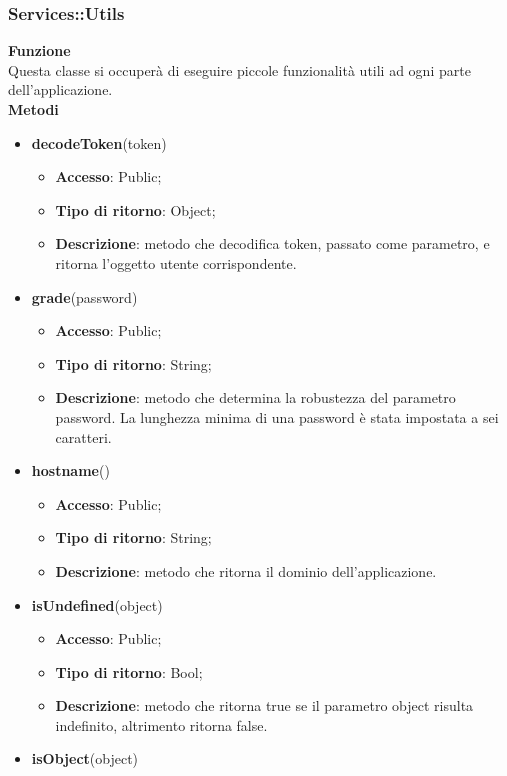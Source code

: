 \subsubsection{Services::Utils}{
		\label{sub:servicesUtils}
		\textbf{Funzione}\\
		\indent Questa classe si occuperà di eseguire piccole funzionalità utili ad ogni parte dell'applicazione.\\
		\textbf{Metodi}
		\begin{itemize}
			\item \textbf{decodeToken}(token)
			\begin{itemize}
				\item \textbf{Accesso}: Public;
				\item \textbf{Tipo di ritorno}: Object;
				\item \textbf{Descrizione}: metodo che decodifica token, passato come parametro, e ritorna l'oggetto utente corrispondente.
			\end{itemize}
			\item \textbf{grade}(password)
			\begin{itemize}
				\item \textbf{Accesso}: Public;
				\item \textbf{Tipo di ritorno}: String;
				\item \textbf{Descrizione}: metodo che determina la robustezza del parametro password. La lunghezza minima di una password è stata impostata a sei caratteri.
			\end{itemize}
			\item \textbf{hostname}()
			\begin{itemize}
				\item \textbf{Accesso}: Public;
				\item \textbf{Tipo di ritorno}: String;
				\item \textbf{Descrizione}: metodo che ritorna il dominio dell'applicazione.
			\end{itemize}
			\item \textbf{isUndefined}(object)
			\begin{itemize}
				\item \textbf{Accesso}: Public;
				\item \textbf{Tipo di ritorno}: Bool;
				\item \textbf{Descrizione}: metodo che ritorna true se il parametro object risulta indefinito, altrimento ritorna false.
			\end{itemize}
			\item \textbf{isObject}(object)

\end{itemize}}
